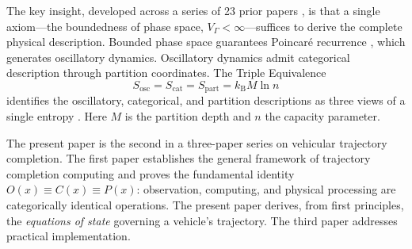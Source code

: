 \documentclass[twocolumn,10pt]{article}
\newcommand{\Scat}{S_{\mathrm{cat}}}
\newcommand{\Sosc}{S_{\mathrm{osc}}}
\newcommand{\Spart}{S_{\mathrm{part}}}
\newcommand{\kB}{k_{\mathrm{B}}}
\newcommand{\VGamma}{V_{\Gamma}}
\begin{document}
The key insight, developed across a series of 23 prior papers \cite{sachikonye2026trajectory, sachikonye2026backward, sachikonye2026poincare, sachikonye2026single, sachikonye2026atmospheric, sachikonye2026gas, sachikonye2026partition, sachikonye2026depth, sachikonye2026transplanckian, sachikonye2026buhera, sachikonye2026current, sachikonye2026mass, sachikonye2026sango, sachikonye2026ion}, is that a single axiom---the boundedness of phase space, $\VGamma < \infty$---suffices to derive the complete physical description. Bounded phase space guarantees Poincar\'{e} recurrence \cite{poincare1890}, which generates oscillatory dynamics. Oscillatory dynamics admit categorical description through partition coordinates. The Triple Equivalence
\begin{equation}\label{eq:triple}
\Sosc = \Scat = \Spart = \kB M \ln n
\end{equation}
identifies the oscillatory, categorical, and partition descriptions as three views of a single entropy \cite{sachikonye2026gas}. Here $M$ is the partition depth and $n$ the capacity parameter.

The present paper is the second in a three-paper series on vehicular trajectory completion. The first paper \cite{sachikonye2026trajectory} establishes the general framework of trajectory completion computing and proves the fundamental identity $O(x) \equiv C(x) \equiv P(x)$: observation, computing, and physical processing are categorically identical operations. The present paper derives, from first principles, the \emph{equations of state} governing a vehicle's trajectory. The third paper addresses practical implementation.
\end{document}
